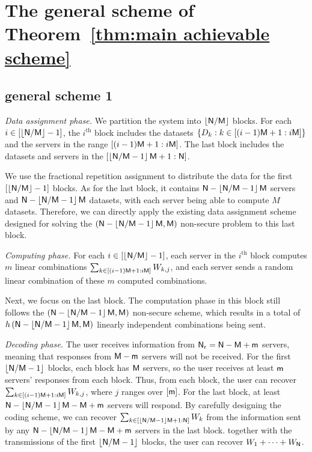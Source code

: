 \documentclass[conference,letterpaper]{IEEEtran}
\begin{document}
\section{The general scheme of Theorem~\ref{thm:main achievable scheme}}
\label{sec:general scheme} 
\subsection{general scheme 1}
\label{general scheme 1}
{\it Data assignment phase.}
We partition the system into $\left\lfloor  {\sf N}/{\sf M} \right\rfloor $ blocks. For each $i \in [\left\lfloor {\sf N}/{\sf M} \right\rfloor - 1]$, the $i^{\text{th}}$ block includes the datasets $\{ D_{k}: k \in \left[(i-1){\sf M}+1: i{\sf M} \right]\}$ and the servers in the range $\left[(i-1){\sf M}+1: i{\sf M} \right]$.
The last block includes the datasets and servers in the $\left[\left\lfloor {\sf N}/{\sf M} - 1 \right\rfloor {\sf M} + 1: {\sf N} \right]$.

We use the fractional repetition assignment to distribute the data for the first $\left[\left\lfloor {\sf N}/{\sf M} \right\rfloor - 1\right]$ blocks. As for the last block, it contains ${\sf N} - \left\lfloor {\sf N}/{\sf M} - 1 \right\rfloor {\sf M}$ servers and ${\sf N} - \left\lfloor {\sf N}/{\sf M} - 1 \right\rfloor {\sf M}$ datasets, with each server being able to compute $M$ datasets. Therefore, we can directly apply the existing data assignment scheme designed for solving the $({\sf N} - \left\lfloor {\sf N}/{\sf M} - 1 \right\rfloor {\sf M}, {\sf M})$ non-secure problem to this last block.

{\it Computing phase.}
For each $i \in \left[\left\lfloor {\sf N}/{\sf M} \right\rfloor - 1\right]$, each server in the $i^{\text{th}}$ block computes $m$ linear combinations $\sum_{k\in \left[(i-1){\sf M} + 1 : i{\sf M}\right]} W_{k,j}$,  and each server sends a random linear combination of these $m$ computed combinations.

Next, we focus on the last block. The computation phase in this block still follows the $({\sf N} - \left\lfloor {\sf N}/{\sf M} - 1 \right\rfloor {\sf M}, {\sf M})$ non-secure scheme, which results in a total of $h\left({\sf N} - \left\lfloor {\sf N}/{\sf M} - 1 \right\rfloor {\sf M}, {\sf M}\right)$ linearly independent combinations being sent.



{\it Decoding phase.}
The user receives information from ${\sf N}_{\rm r} = {\sf N} - {\sf M} + {\sf m}$ servers, meaning that responses from ${\sf M} - {\sf m}$ servers will not be received. For the first $\left\lfloor {\sf N}/{\sf M} - 1 \right\rfloor$ blocks, each block has ${\sf M}$ servers, so the user receives at least ${\sf m}$ servers' responses from each block. Thus, from each block, the user can recover $\sum_{k \in \left[(i-1){\sf M} + 1 : i{\sf M}\right]} W_{k,j}$, where $j$ ranges over $[{\sf m}]$. 
For the last block, at least ${\sf N} - \left\lfloor {\sf N}/{\sf M} - 1 \right\rfloor {\sf M} - {\sf M} + {\sf m}$ servers will respond. By carefully designing the coding scheme, we can recover $\sum_{k \in \left[\left\lfloor {\sf N}/{\sf M} - 1 \right\rfloor {\sf M} + 1 : {\sf N}\right]} W_k$ from the information sent by any ${\sf N} - \left\lfloor {\sf N}/{\sf M} - 1 \right\rfloor {\sf M} - {\sf M} + {\sf m}$ servers in the last block.
together with the transmissions of the first $\left\lfloor  {\sf N}/{\sf M} -1 \right\rfloor$ blocks, the user can recover $W_1 + \cdots +W_{{\sf N}}$.
\end{document}
